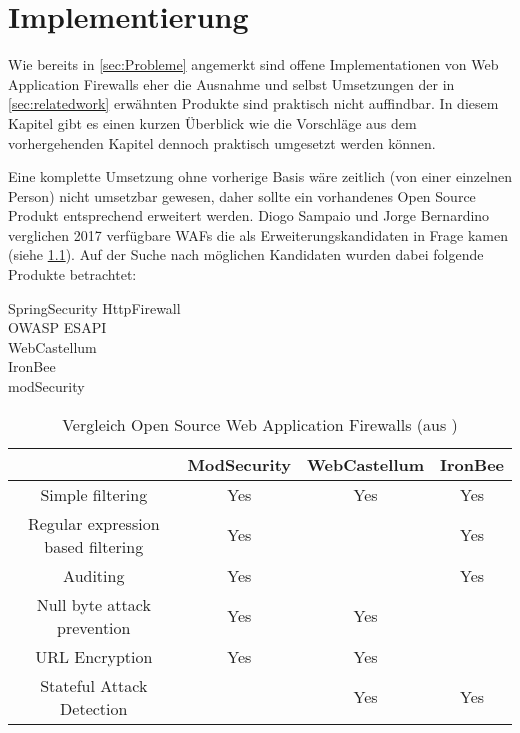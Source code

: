 \chapter{Implementierung}



Wie bereits in \ref{sec:Probleme} angemerkt sind offene Implementationen von Web Application Firewalls eher die Ausnahme und selbst Umsetzungen der in \ref{sec:relatedwork} erwähnten Produkte sind praktisch nicht auffindbar. In diesem Kapitel gibt es einen kurzen Überblick wie die Vorschläge aus dem vorhergehenden Kapitel dennoch praktisch umgesetzt werden können.

Eine komplette Umsetzung ohne vorherige Basis wäre zeitlich (von einer einzelnen Person) nicht umsetzbar gewesen, daher sollte ein vorhandenes Open Source Produkt entsprechend erweitert werden. Diogo Sampaio und Jorge Bernardino verglichen 2017 verfügbare WAFs die als Erweiterungskandidaten in Frage kamen (siehe \ref{tab:my_vergos}). Auf der Suche nach möglichen Kandidaten  wurden dabei folgende Produkte betrachtet:

\begin{description}
\item [SpringSecurity HttpFirewall]
\item [OWASP ESAPI]
\item [WebCastellum]
\item [IronBee]
\item [modSecurity]
\end{description}

\begin{table}[h]
  \centering
  \begin{tabular}{|c | c | c | c |} 
    \hline
    & \textbf{ModSecurity} & \textbf{WebCastellum} & \textbf{IronBee} \\ [0.5ex] 
    \hline
    Simple filtering & Yes & Yes & Yes \\ 
    \hline
    Regular expression based filtering & Yes &  & Yes \\
    \hline
    Auditing & Yes &  & Yes \\
    \hline
    Null byte attack prevention & Yes & Yes &  \\
    \hline
    URL Encryption & Yes & Yes &  \\ [1ex] 
    \hline
    Stateful Attack Detection & & Yes & Yes \\
    \hline
  \end{tabular}
  \caption{Vergleich Open Source Web Application Firewalls (aus \cite{Sampaio2017}) }
  \label{tab:my_vergos}
\end{table}

